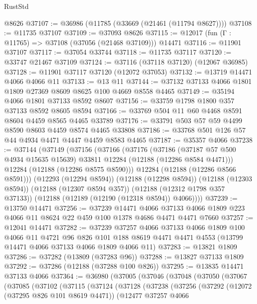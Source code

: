 \begin{lexlean}{RustStd}
\begin{coremodule}
    @8626
@37107 := @36986 (@11785 (@33669 (@21461 (@11794 @8627))))
@37108 := @11735 @37107
@37109 := @37093 @8626
@37115 := @12017 (fun (Γ : @11765) => @37108 (@37056 (@21468 @37109))) @14471
@37116 := @11901 @37107
@37117 := @37054 @33744
@37118 := @11735 @37117
@37120 := @33747 @21467 @37109
@37124 := @37116 (@37118 @37120) (@12067 @36985)
@37128 := @11901 @37117 @37120 (@12072 @37053)
@37132 := @13719 @14471 @4066 @4066 @11
@37133 := @13 @11
@37144 := @37132 @37133 @4066 @1801 @1809 @27369 @8609 @8625 @100 @4669 @8558 @4465
@37149 := @35194 @4066 @1801 @37133 @8592 @8607
@37156 := @33759 @1798 @1800 @357 @37133 @8592 @8605 @8594
@37166 := @33769 @504 @11 @60 @4468 @8591 @8604 @4459 @8565 @4465 @33789
@37176 := @33791 @503 @57 @59 @4499 @8590 @8603 @4459 @8574 @4465 @33808
@37186 := @33768 @501 @126 @57 @44 @4934 @4471 @4447 @4459 @8583 @4465
@37187 := @35357 @4066
@37238 := @37144
    (@37149
      (@37156
        (@37166
          (@37176
            (@37186
              (@37187 @57 @500 @4934 @15635 @15639)
              @33811
              @12284
              (@12188 (@12286 @8584 @4471)))
            @12284
            (@12188 (@12286 @8575 @8590)))
          @12284
          (@12188 (@12286 @8566 @8591)))
        (@12293 (@12294 @8594))
        (@12188 (@12298 @8594))
        (@12188 (@12303 @8594))
        (@12188 (@12307 @8594 @357))
        (@12188 (@12312 @1798 @357 @37133))
        (@12188 (@12189 (@12190 (@12318 @8594)) @4066))))
@37239 := @13750 @14471
@37256 := @37239
    @14471
    @4066
    @37133
    @4066
    @1809
    @223
    @4066
    @11
    @8624
    @22
    @459
    @100
    @1378
    @4686
    @4471
    @4471
    @7660
@37257 := @12041 @14471
@37282 := @37239
    @37257
    @4066
    @37133
    @4066
    @1809
    @100
    @4066
    @11
    @4721
    @96
    @826
    @101
    @188
    @8619
    @4471
    @4471
    @4553
    (@13799 @14471 @4066 @37133 @4066 @1809 @4066 @11)
@37283 := @13821 @1809
@37286 := @37282 (@13809 (@37283 @96))
@37288 := @13827 @37133 @1809
@37292 := @37286 (@12188 (@37288 @100 @826))
@37295 := @13835 @14471 @37133 @4066
@37364 := @36980
    (@37005
      (@37046
        (@37048
          (@37050
            (@37067
              (@37085
                (@37102
                  (@37115
                    (@37124
                      (@37128
                        (@37238
                          (@37256
                            (@37292
                              (@12072 (@37295 @826 @101 @8619 @4471))
                              (@12477
                                @37257
                                @4066

\end{coremodule}
\end{lexlean}
